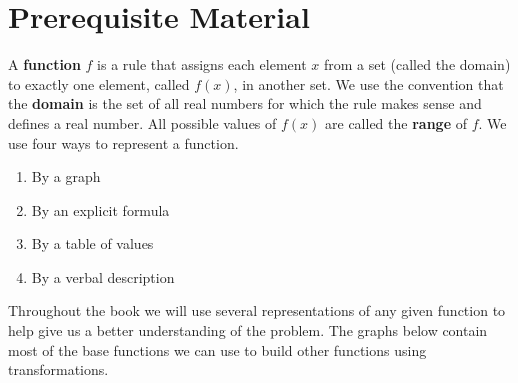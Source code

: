 \documentclass[11pt]{report}
\begin{document}
\section{Prerequisite Material}

A \textbf{function} $f$ is a rule that assigns each element $x$ from a set (called the domain) to exactly one element, called $f(x)$, in another set. We use the convention that the \textbf{domain} is the set of all real numbers for which the rule makes sense and defines a real number. All possible values of $f(x)$ are called the \textbf{range} of $f$. We use four ways to represent a function.
\begin{enumerate}
\item By a graph
\item By an explicit formula         %
\item By a table of values
\item By a verbal description
\end{enumerate}

Throughout the book we will use several representations of any given function to help give us a better understanding of the problem. The graphs below contain most of the base functions we can use to build other functions using transformations.
\end{document}
